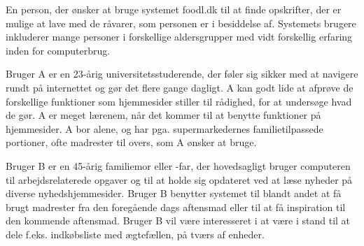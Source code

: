 {En person, der ønsker at bruge systemet foodl.dk til at finde opskrifter, der er mulige at lave med de råvarer, som personen er i besiddelse af.}
{Systemets brugere inkluderer mange personer i forskellige aldersgrupper med vidt forskellig erfaring inden for computerbrug.}
{Bruger A er en 23-årig universitetsstuderende, der føler sig sikker med at navigere rundt på internettet og gør det flere gange dagligt. A kan godt lide at afprøve de forskellige funktioner som hjemmesider stiller til rådighed, for at undersøge hvad de gør. A er meget lærenem, når det kommer til at benytte funktioner på hjemmesider. A bor alene, og har pga. supermarkedernes familietilpassede portioner, ofte madrester til overs, som A ønsker at bruge. 

Bruger B er en 45-årig familiemor eller -far, der hovedsagligt bruger computeren til arbejdsrelaterede opgaver og til at holde sig opdateret ved at læse nyheder på diverse nyhedshjemmesider. Bruger B benytter systemet til blandt andet at få brugt madrester fra den foregående dags aftensmad eller til at få inspiration til den kommende aftensmad. Bruger B vil være interesseret i at være i stand til at dele f.eks. indkøbsliste med ægtefællen, på tværs af enheder.}
{}
